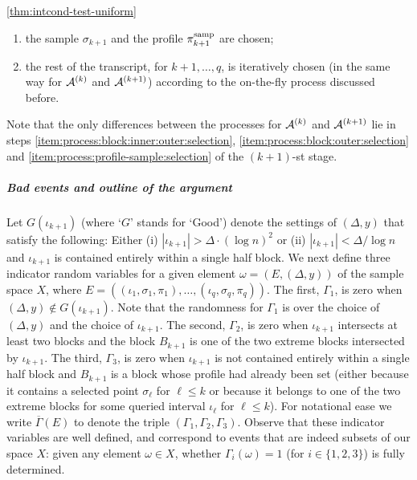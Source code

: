 \begin{proofof}{\cref{thm:intcond-test-uniform}}
\begin{enumerate}
\begin{enumerate}
    \end{enumerate}
         \item \label{item:process:profile-sample:selection} the sample $\sigma_{k+1}$ and the profile $\pi_{k+1}^{\rm samp}$ are chosen;
    \item the rest of the transcript, for $k+1,\dots,q$, is iteratively chosen (in the same way for $\mathcal{A}^{(k)}$ and $\mathcal{A}^{(k+1)}$) according to the on-the-fly process discussed before.
\end{enumerate}
Note that the only differences between the processes for $\mathcal{A}^{(k)}$ and $\mathcal{A}^{(k+1)}$ lie in steps \eqref{item:process:block:inner:outer:selection}, \eqref{item:process:block:outer:selection} and \eqref{item:process:profile-sample:selection} of the $(k+1)$-st stage.

\subparagraph{Bad events and outline of the argument}

Let $G(\iota_{k+1})$  (where `$G$' stands for `Good') denote the
settings of $(\Delta,y)$ that satisfy the following: Either
(i) $|\iota_{k+1}| > \Delta\cdot(\log n)^2$ or (ii) $|\iota_{k+1}| < \Delta/\log n$ and $\iota_{k+1}$
is contained entirely within a single half block.
 We next define three indicator random variables for a given
element $\omega=(E,(\Delta,y))$ of the sample space $X$, where
 $E = ((\iota_1, \sigma_1, \pi_1),\dots,(\iota_q, \sigma_q, \pi_q))$.
The first, $\Gamma_1$, is zero when $(\Delta,y) \notin G(\iota_{k+1})$.
Note that the randomness for $\Gamma_1$ is over
the choice of $(\Delta,y)$ and the choice of $\iota_{k+1}.$
 The second, $\Gamma_2$, is zero when
  $\iota_{k+1}$ intersects at least two blocks and  the block
 $B_{k+1}$ is one of the two extreme blocks intersected by $\iota_{k+1}$.
The third, $\Gamma_3$, is zero when
$\iota_{k+1}$ is not contained entirely within a single half block and
$B_{k+1}$  is a block whose
profile had already been set (either because it contains a selected
point $\sigma_\ell$ for $\ell \leq k$ or because it belongs to one of the
two extreme blocks for some queried interval $\iota_\ell$ for $\ell \leq k$).
For notational ease we write $\overline{\Gamma}(E)$ to denote the triple
$(\Gamma_1,\Gamma_2,\Gamma_3)$.
Observe that these indicator variables are well defined, and correspond to events that are indeed subsets of our space $X$:
 given any element $\omega\in X$, whether $\Gamma_i(\omega)=1$ (for $i\in\{1,2,3\}$) is fully determined.\medskip


\end{proofof}
